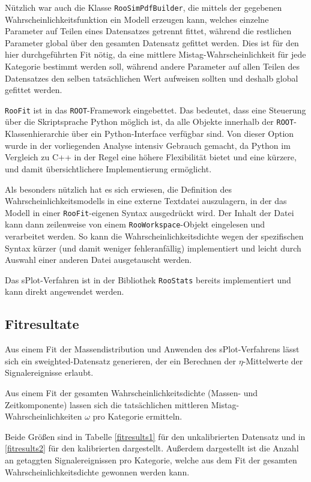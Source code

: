 Nützlich war auch die Klasse \texttt{RooSimPdfBuilder}, die mittels der gegebenen Wahrscheinlichkeitsfunktion ein Modell erzeugen kann, welches einzelne Parameter auf Teilen eines Datensatzes getrennt fittet, während die restlichen Parameter global über den gesamten Datensatz gefittet werden.
Dies ist für den hier durchgeführten Fit nötig, da eine mittlere Mistag-Wahrscheinlichkeit für jede Kategorie bestimmt werden soll, während andere Parameter auf allen Teilen des Datensatzes den selben tatsächlichen Wert aufweisen sollten und deshalb global gefittet werden.

\texttt{RooFit} ist in das \texttt{ROOT}-Framework eingebettet.
Das bedeutet, dass eine Steuerung über die Skriptsprache Python möglich ist, da alle Objekte innerhalb der \texttt{ROOT}-Klassenhierarchie über ein Python-Interface verfügbar sind.
Von dieser Option wurde in der vorliegenden Analyse intensiv Gebrauch gemacht, da Python im Vergleich zu C++ in der Regel eine höhere Flexibilität bietet und eine kürzere, und damit übersichtlichere Implementierung ermöglicht.

Als besonders nützlich hat es sich erwiesen, die Definition des Wahrscheinlichkeitsmodells in eine externe Textdatei auszulagern, in der das Modell in einer \texttt{RooFit}-eigenen Syntax ausgedrückt wird.
Der Inhalt der Datei kann dann zeilenweise von einem \texttt{RooWorkspace}-Objekt eingelesen und verarbeitet werden.
So kann die Wahrscheinlichkeitsdichte wegen der spezifischen Syntax kürzer (und damit weniger fehleranfällig) implementiert und leicht durch Auswahl einer anderen Datei ausgetauscht werden.

Das sPlot-Verfahren ist in der Bibliothek \texttt{RooStats} bereits implementiert und kann direkt angewendet werden.

\subsection{Fitresultate}

Aus einem Fit der Massendistribution und Anwenden des sPlot-Verfahrens lässt sich ein sweighted-Datensatz generieren, der ein Berechnen der $η$-Mittelwerte der  Signalereignisse  erlaubt.

Aus einem Fit der gesamten Wahrscheinlichkeitsdichte (Massen- und Zeitkomponente) lassen sich die tatsächlichen mittleren Mistag-Wahrscheinlichkeiten $ω$ pro Kategorie ermitteln.

Beide Größen sind in Tabelle \ref{fitresults1} für den unkalibrierten Datensatz und in \ref{fitresults2} für den kalibrierten dargestellt.
Außerdem dargestellt ist die Anzahl an getaggten Signalereignissen pro Kategorie, welche aus dem Fit der gesamten Wahrscheinlichkeitsdichte gewonnen werden kann.


